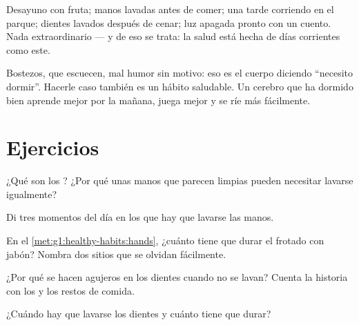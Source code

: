 \begin{example}\label{ex:g1:healthy-habits:day}
Desayuno con fruta; manos lavadas antes de comer; una tarde corriendo
en el parque; dientes lavados después de cenar; luz apagada pronto con
un cuento. Nada extraordinario --- y de eso se trata: la salud está
hecha de días corrientes como este.
\end{example}

\begin{remark}\label{rem:g1:healthy-habits:tired}
Bostezos,  que escuecen, mal humor sin motivo: eso es el cuerpo
diciendo ``necesito dormir''. Hacerle caso también es un hábito
saludable. Un cerebro que ha dormido bien aprende mejor por la mañana,
juega mejor y se ríe más fácilmente.
\end{remark}

\section{Ejercicios}

\begin{exercise}[$\star$]\label{exo:g1:healthy-habits:1}
¿Qué son los ? ¿Por qué unas manos que parecen limpias pueden
necesitar lavarse igualmente?
\end{exercise}

\begin{exercise}[$\star$]\label{exo:g1:healthy-habits:2}
Di tres momentos del día en los que hay que lavarse las manos.
\end{exercise}

\begin{exercise}[$\star$]\label{exo:g1:healthy-habits:3}
En el \cref{met:g1:healthy-habits:hands}, ¿cuánto tiene que durar el
frotado con jabón? Nombra dos sitios que se olvidan fácilmente.
\end{exercise}

\begin{exercise}[$\star$]\label{exo:g1:healthy-habits:4}
¿Por qué se hacen agujeros en los dientes cuando no se lavan? Cuenta
la historia con los  y los restos de comida.
\end{exercise}

\begin{exercise}[$\star$]\label{exo:g1:healthy-habits:5}
¿Cuándo hay que lavarse los dientes y cuánto tiene que durar?
\end{exercise}

